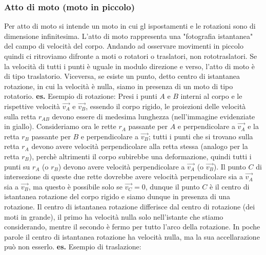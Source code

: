 \subsubsection{Atto di moto (moto in piccolo)}
Per atto di moto si intende un moto in cui gl ispostamenti e le rotazioni sono di dimensione infinitesima. L'atto di moto rappresenta una "fotografia istantanea" del campo di velocità del corpo.\newline
Andando ad osservare movimenti in piccolo quindi ci ritroviamo difronte a moti o rotatori o traslatori, non rototraslatori. Se la velocità di tutti i punti è uguale in modulo direzione e verso, l'atto di moto è di tipo traslatorio. Viceversa, se esiste un punto, detto centro di istantanea rotazione, in cui la velocità è nulla, siamo in presenza di un moto di tipo rotatorio.\newline
\textbf{es.} Esempio di rotazione:\newline
Presi i punti $A$ e $B$ interni al corpo e le rispettive velocità $\vec{v_A}$ e $\vec{v_B}$, essendo il corpo rigido, le proiezioni delle velocità sulla retta $r_{AB}$ devono essere di medesima lunghezza (nell'immagine evidenziate in giallo).\newline
Consideriamo ora le rette $r_A$ passante per $A$ e perpendicolare a $\vec{v_A}$ e la retta $r_B$ passante per $B$ e perpendicolare a $\vec{v_B}$; tutti i punti che si trovano sulla retta $r_A$ devono avere velocità perpendicolare alla retta stessa (analogo per la retta $r_B$), perchè altrimenti il corpo subirebbe una deformazione, quindi tutti i punti su $r_A$ (o $r_B$) devono avere velocità perpendicolare a $\vec{v_A}$ (o $\vec{v_B}$). Il punto $C$ di intersezione di queste due rette dovrebbe avere velocità perpendicolare sia a $\vec{v_A}$ sia a $\vec{v_B}$, ma questo è possibile solo se $\vec{v_C} = 0$, dunque il punto $C$ è il centro di istantanea rotazione del corpo rigido e siamo dunque in presenza di una rotazione.\newline
Il centro di istantanea rotazione differisce dal centro di rotazione (dei moti in grande), il primo ha velocità nulla solo nell'istante che stiamo considerando, mentre il secondo è fermo per tutto l'arco della rotazione. In poche parole il centro di istantanea rotazione ha velocità nulla, ma la sua accellarazione può non esserlo.\newline
\textbf{es.} Esempio di traslazione:\newline
